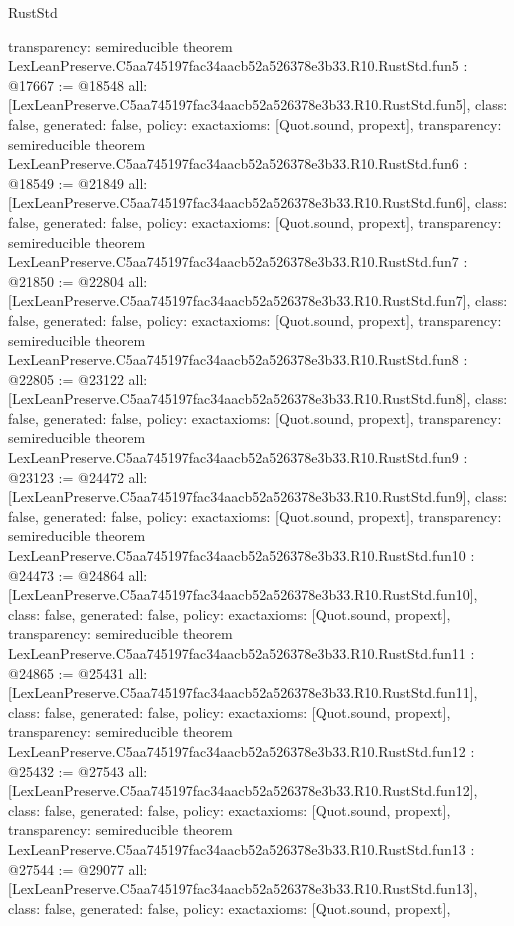 \begin{lexlean}{RustStd}
\begin{coremodule}
{  transparency: semireducible
}
theorem LexLeanPreserve.C5aa745197fac34aacb52a526378e3b33.R10.RustStd.fun5 : @17667 := @18548 {
  all: [LexLeanPreserve.C5aa745197fac34aacb52a526378e3b33.R10.RustStd.fun5],
  class: false,
  generated: false,
  policy: exact{axioms: [Quot.sound, propext]},
  transparency: semireducible
}
theorem LexLeanPreserve.C5aa745197fac34aacb52a526378e3b33.R10.RustStd.fun6 : @18549 := @21849 {
  all: [LexLeanPreserve.C5aa745197fac34aacb52a526378e3b33.R10.RustStd.fun6],
  class: false,
  generated: false,
  policy: exact{axioms: [Quot.sound, propext]},
  transparency: semireducible
}
theorem LexLeanPreserve.C5aa745197fac34aacb52a526378e3b33.R10.RustStd.fun7 : @21850 := @22804 {
  all: [LexLeanPreserve.C5aa745197fac34aacb52a526378e3b33.R10.RustStd.fun7],
  class: false,
  generated: false,
  policy: exact{axioms: [Quot.sound, propext]},
  transparency: semireducible
}
theorem LexLeanPreserve.C5aa745197fac34aacb52a526378e3b33.R10.RustStd.fun8 : @22805 := @23122 {
  all: [LexLeanPreserve.C5aa745197fac34aacb52a526378e3b33.R10.RustStd.fun8],
  class: false,
  generated: false,
  policy: exact{axioms: [Quot.sound, propext]},
  transparency: semireducible
}
theorem LexLeanPreserve.C5aa745197fac34aacb52a526378e3b33.R10.RustStd.fun9 : @23123 := @24472 {
  all: [LexLeanPreserve.C5aa745197fac34aacb52a526378e3b33.R10.RustStd.fun9],
  class: false,
  generated: false,
  policy: exact{axioms: [Quot.sound, propext]},
  transparency: semireducible
}
theorem LexLeanPreserve.C5aa745197fac34aacb52a526378e3b33.R10.RustStd.fun10 : @24473 := @24864 {
  all: [LexLeanPreserve.C5aa745197fac34aacb52a526378e3b33.R10.RustStd.fun10],
  class: false,
  generated: false,
  policy: exact{axioms: [Quot.sound, propext]},
  transparency: semireducible
}
theorem LexLeanPreserve.C5aa745197fac34aacb52a526378e3b33.R10.RustStd.fun11 : @24865 := @25431 {
  all: [LexLeanPreserve.C5aa745197fac34aacb52a526378e3b33.R10.RustStd.fun11],
  class: false,
  generated: false,
  policy: exact{axioms: [Quot.sound, propext]},
  transparency: semireducible
}
theorem LexLeanPreserve.C5aa745197fac34aacb52a526378e3b33.R10.RustStd.fun12 : @25432 := @27543 {
  all: [LexLeanPreserve.C5aa745197fac34aacb52a526378e3b33.R10.RustStd.fun12],
  class: false,
  generated: false,
  policy: exact{axioms: [Quot.sound, propext]},
  transparency: semireducible
}
theorem LexLeanPreserve.C5aa745197fac34aacb52a526378e3b33.R10.RustStd.fun13 : @27544 := @29077 {
  all: [LexLeanPreserve.C5aa745197fac34aacb52a526378e3b33.R10.RustStd.fun13],
  class: false,
  generated: false,
  policy: exact{axioms: [Quot.sound, propext]},
}
\end{coremodule}
\end{lexlean}
